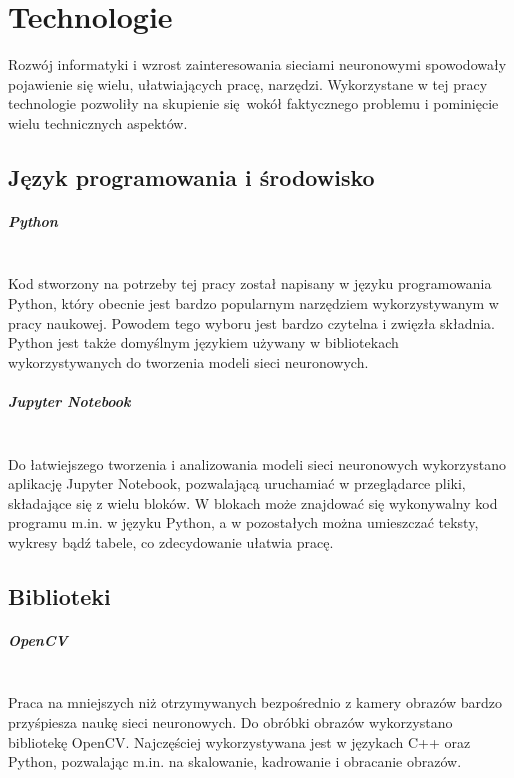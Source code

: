 
\chapter{Technologie}
Rozwój informatyki i wzrost zainteresowania sieciami neuronowymi spowodowały pojawienie
się wielu, ułatwiających pracę, narzędzi. Wykorzystane w tej pracy technologie
pozwoliły na skupienie się wokół faktycznego problemu i pominięcie wielu technicznych
aspektów.

\section{Język programowania i środowisko}

\paragraph{Python} \mbox{}\\
Kod stworzony na potrzeby tej pracy został napisany w języku programowania Python, który
obecnie jest bardzo popularnym narzędziem wykorzystywanym w pracy naukowej.
Powodem tego wyboru jest bardzo czytelna i zwięzła składnia. Python jest także domyślnym
językiem używany w bibliotekach wykorzystywanych do tworzenia modeli sieci neuronowych.

\paragraph{Jupyter Notebook} \mbox{}\\
Do łatwiejszego tworzenia i analizowania modeli sieci neuronowych wykorzystano aplikację
Jupyter Notebook, pozwalającą uruchamiać w przeglądarce pliki, składające się z wielu bloków.
W blokach może znajdować się wykonywalny kod programu m.in. w języku Python,
a w pozostałych można umieszczać teksty, wykresy bądź tabele, co zdecydowanie ułatwia pracę.\\

\section{Biblioteki}

\paragraph{OpenCV} \mbox{}\\
Praca na mniejszych niż otrzymywanych bezpośrednio z kamery obrazów bardzo przyśpiesza
naukę sieci neuronowych. Do obróbki obrazów wykorzystano bibliotekę OpenCV.
Najczęściej wykorzystywana jest w językach C++ oraz Python, pozwalając m.in. na
skalowanie, kadrowanie i obracanie obrazów.

